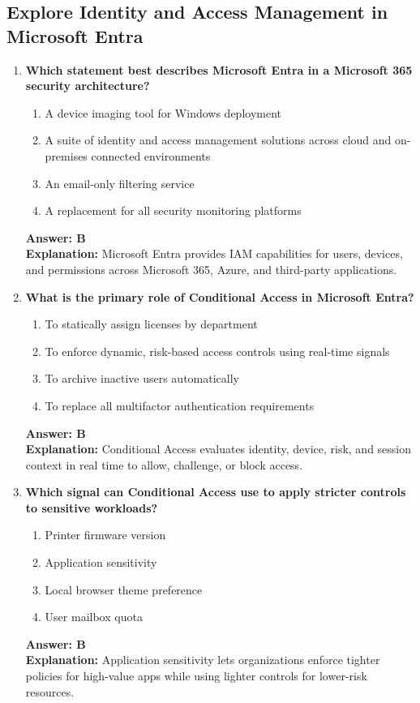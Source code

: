 \documentclass[10pt]{article}
\begin{document}
\subsection{Explore Identity and Access Management in Microsoft Entra}
\begin{enumerate}[leftmargin=*]

\item \textbf{Which statement best describes Microsoft Entra in a Microsoft 365 security architecture?}
\begin{enumerate}[label=\Alph*.]
  \item A device imaging tool for Windows deployment
  \item A suite of identity and access management solutions across cloud and on-premises connected environments
  \item An email-only filtering service
  \item A replacement for all security monitoring platforms
\end{enumerate}
\textbf{Answer: B}\\
\textbf{Explanation:} Microsoft Entra provides IAM capabilities for users, devices, and permissions across Microsoft 365, Azure, and third-party applications.

\item \textbf{What is the primary role of Conditional Access in Microsoft Entra?}
\begin{enumerate}[label=\Alph*.]
  \item To statically assign licenses by department
  \item To enforce dynamic, risk-based access controls using real-time signals
  \item To archive inactive users automatically
  \item To replace all multifactor authentication requirements
\end{enumerate}
\textbf{Answer: B}\\
\textbf{Explanation:} Conditional Access evaluates identity, device, risk, and session context in real time to allow, challenge, or block access.

\item \textbf{Which signal can Conditional Access use to apply stricter controls to sensitive workloads?}
\begin{enumerate}[label=\Alph*.]
  \item Printer firmware version
  \item Application sensitivity
  \item Local browser theme preference
  \item User mailbox quota
\end{enumerate}
\textbf{Answer: B}\\
\textbf{Explanation:} Application sensitivity lets organizations enforce tighter policies for high-value apps while using lighter controls for lower-risk resources.


\end{enumerate}
\end{document}
